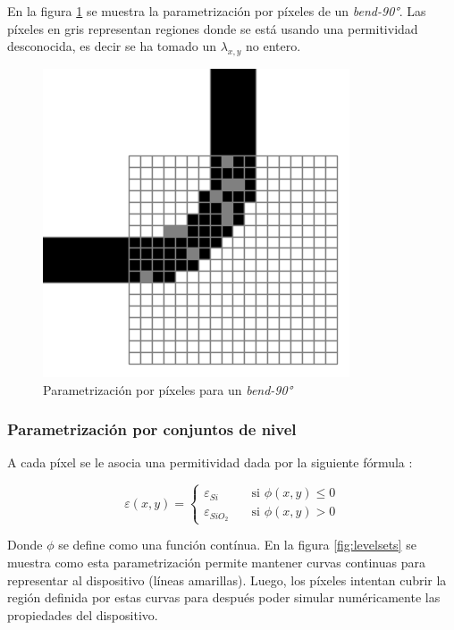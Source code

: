 En la figura \ref{fig:pixeles} se muestra la parametrización por píxeles de un \emph{bend-90°}. 
Las píxeles en gris representan regiones donde se está usando una permitividad desconocida, es decir se ha tomado un $\lambda_{x,y}$ no entero.

\begin{figure}[h]
  \centering
  \includegraphics[scale=0.8]{image/theory/parametrization-pixeles.png}
  \caption{Parametrización por píxeles para un \emph{bend-90°}}
  \label{fig:pixeles}
\end{figure}


\subsubsection{Parametrización por conjuntos de nivel}

A cada píxel se le asocia una permitividad dada por la siguiente fórmula \citep{Piggott2017}:

  \[ \varepsilon(x, y) =
    \begin{cases}
      \varepsilon_{Si}       & \quad \text{si } \phi(x, y) \leq 0\\
      \varepsilon_{SiO_2}    & \quad \text{si } \phi(x, y) > 0
    \end{cases}
  \]

Donde $\phi$ se define como una función contínua. 
En la figura \ref{fig:levelsets} se muestra como esta parametrización permite mantener curvas continuas para representar al dispositivo (líneas amarillas).
Luego, los píxeles intentan cubrir la región definida por estas curvas para después poder simular numéricamente las propiedades del dispositivo.

